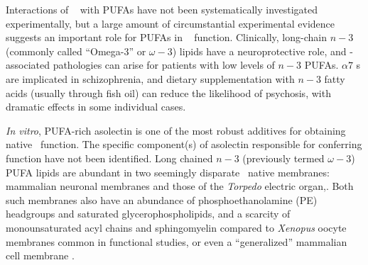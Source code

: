 Interactions of \nachr~ with PUFAs have not been systematically investigated experimentally, but a large amount of circumstantial experimental evidence suggests an important role for PUFAs in \nachr~ function.    Clinically, long-chain $n-3$  (commonly called ``Omega-3'' or $\omega-3$) lipids have a neuroprotective role\cite{Piomelli2007}, and \nachr-associated pathologies can arise for patients with low levels of $n-3$ PUFAs. $\alpha7$ \nachr s are implicated in schizophrenia\cite{Haydar2010}, and dietary supplementation with $n-3$ fatty acids (usually through fish oil) can reduce the likelihood of psychosis, with dramatic effects in some individual cases.\cite{Amminger2010}   

{\it In vitro}, PUFA-rich asolectin\cite{Regost2003,Olsen2003} is one of the most robust additives\cite{Criado1982} for obtaining native \nachr~function. The specific component(s) of asolectin responsible for conferring function have not been identified. 
Long chained $n-3$  (previously termed $\omega-3$)  PUFA lipids are abundant in two seemingly disparate \nachr~native membranes: mammalian neuronal membranes\cite{Breckenridge_Adult_1973,Cotman_Lipid_1969} and those of the \textit{Torpedo} electric organ,\cite{Barrantes1989,Quesada2016}. Both such membranes also have an abundance of phosphoethanolamine (PE) headgroups and saturated glycerophospholipids, and a scarcity of monounsaturated acyl chains and sphingomyelin compared to \textit{Xenopus} oocyte membranes \cite{Hill_Isolation_2005} common in functional studies, or even a ``generalized'' mammalian cell membrane \cite{Inglfsson_Lipid_2014}.    %
